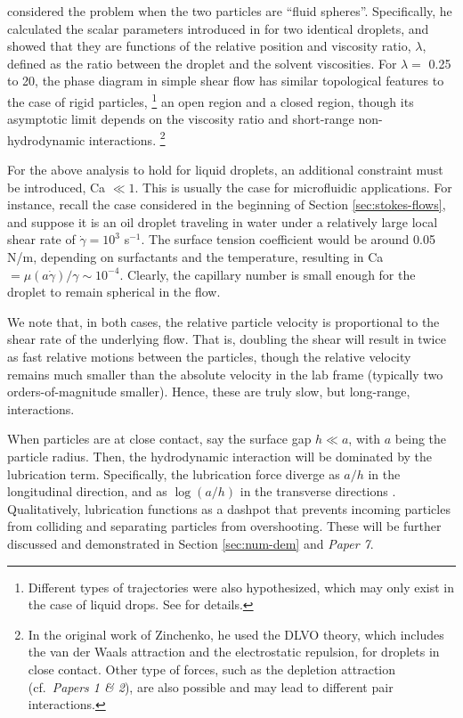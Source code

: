\cite{Zinchenko1983,Zinchenko1984} considered the problem when the two particles are ``fluid spheres''.
Specifically, he calculated the scalar parameters introduced in \cite{batchelor_green_1972} for two identical droplets, and showed that they are functions of the relative position and viscosity ratio, $\lambda$, defined as the ratio between the droplet and the solvent viscosities.
For $\lambda=$ 0.25 to 20, the phase diagram in simple shear flow has similar topological features to the case of rigid particles,%
\footnote{Different types of trajectories were also hypothesized, which may only exist in the case of liquid drops. See \cite{Zinchenko1984} for details.}
\ie an open region and a closed region, though its asymptotic limit depends on the viscosity ratio and short-range non-hydrodynamic interactions.%
\footnote{In the original work of Zinchenko, he used the DLVO theory, which includes the van der Waals attraction and the electrostatic repulsion, for droplets in close contact. Other type of forces, such as the depletion attraction (cf.\ \emph{Papers 1 \& 2}), are also possible and may lead to different pair interactions.}

For the above analysis to hold for liquid droplets, an additional constraint must be introduced, \ie Ca $\ll 1$.
This is usually the case for microfluidic applications. For instance, recall the case considered in the beginning of Section \ref{sec:stokes-flows}, and suppose it is an oil droplet traveling in water under a relatively large local shear rate of $\dot{\gamma}=10^3$ s$^{-1}$. The surface tension coefficient would be around 0.05 N/m, depending on surfactants and the temperature, resulting in Ca $=\mu(a\dot{\gamma})/\gamma \sim 10^{-4}$. Clearly, the capillary number is small enough for the droplet to remain spherical in the flow.

We note that, in both cases, the relative particle velocity is proportional to the shear rate of the underlying flow. That is, doubling the shear will result in twice as fast relative motions between the particles, though the relative velocity remains much smaller than the absolute velocity in the lab frame (typically two orders-of-magnitude smaller). Hence, these are truly slow, but long-range, interactions.

When particles are at close contact, say the surface gap $h \ll a$, with $a$ being the particle radius. Then, the hydrodynamic interaction will be dominated by the lubrication term. Specifically, the lubrication force diverge as $a/h$ in the longitudinal direction, and as $\log(a/h)$ in the transverse directions \citep{jeffrey_onishi_1984, jeffrey1992}. Qualitatively, lubrication functions as a dashpot that prevents incoming particles from colliding and separating particles from overshooting. These will be further discussed and demonstrated in Section \ref{sec:num-dem} and \emph{Paper 7}.


